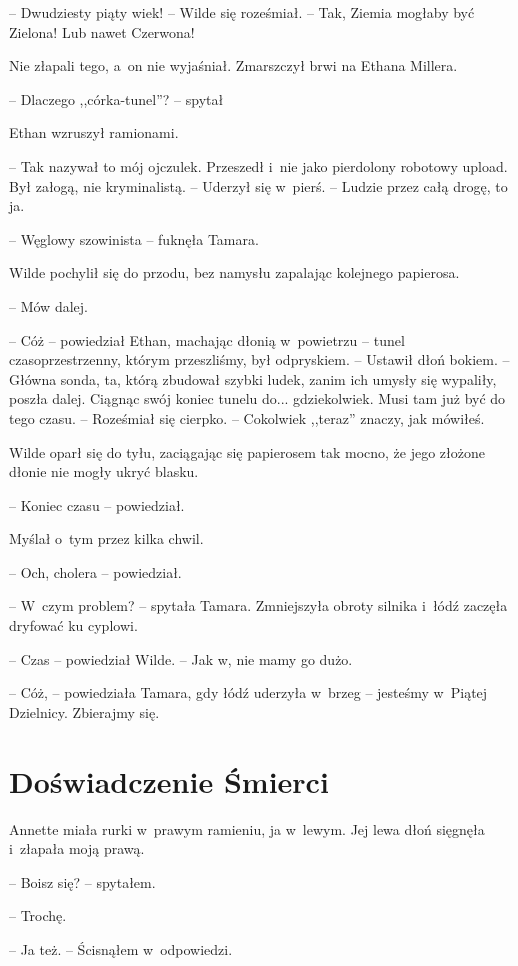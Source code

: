 \documentclass[oneside,polish,11pt,sfheadings]{mwbk}
\begin{document}
-- Dwudziesty piąty wiek! -- Wilde się roześmiał. -- Tak, Ziemia mogłaby
być Zielona! Lub nawet Czerwona!

Nie złapali tego, a~on nie wyjaśniał. Zmarszczył brwi na Ethana Millera.

-- Dlaczego ,,córka-tunel''? -- spytał

Ethan wzruszył ramionami. 

-- Tak nazywał to mój ojczulek. Przeszedł i~nie
jako pierdolony robotowy upload. Był załogą, nie kryminalistą. -- Uderzył
się w~pierś. -- Ludzie przez całą drogę, to ja.

-- Węglowy szowinista -- fuknęła Tamara.

Wilde pochylił się do przodu, bez namysłu zapalając kolejnego papierosa.

-- Mów dalej.

-- Cóż -- powiedział Ethan, machając dłonią w~powietrzu -- tunel
czasoprzestrzenny, którym przeszliśmy, był odpryskiem. -- Ustawił dłoń
bokiem. -- Główna sonda, ta, którą zbudował szybki ludek, zanim ich
umysły się wypaliły, poszła dalej. Ciągnąc swój koniec tunelu do...
gdziekolwiek. Musi tam już być do tego czasu. -- Roześmiał się cierpko. -- Cokolwiek ,,teraz'' znaczy, jak mówiłeś.

Wilde oparł się do tyłu, zaciągając się papierosem tak mocno, że jego
złożone dłonie nie mogły ukryć blasku.

-- Koniec czasu -- powiedział.

Myślał o~tym przez kilka chwil.

-- Och, cholera -- powiedział.

-- W~czym problem? -- spytała Tamara. Zmniejszyła obroty silnika i~łódź
zaczęła dryfować ku cyplowi.

-- Czas -- powiedział Wilde. -- Jak w, nie mamy go dużo.

-- Cóż, -- powiedziała Tamara, gdy łódź uderzyła w~brzeg -- jesteśmy w~Piątej Dzielnicy. Zbierajmy się.

\chapter{Doświadczenie Śmierci}

Annette miała rurki w~prawym ramieniu, ja w~lewym. Jej lewa dłoń
sięgnęła i~złapała moją prawą.

-- Boisz się? -- spytałem.

-- Trochę.

-- Ja też. -- Ścisnąłem w~odpowiedzi.
\end{document}
